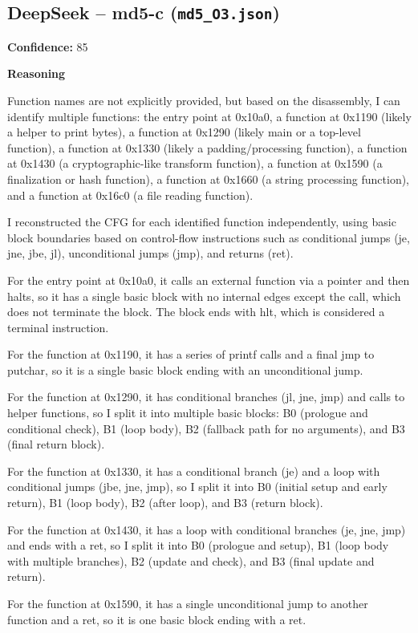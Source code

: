 \subsection{DeepSeek -- md5-c (\texttt{md5\_O3.json})}

\textbf{Confidence:} 85

\textbf{Reasoning}

Function names are not explicitly provided, but based on the disassembly, I can identify multiple functions: the entry point at 0x10a0, a function at 0x1190 (likely a helper to print bytes), a function at 0x1290 (likely main or a top-level function), a function at 0x1330 (likely a padding/processing function), a function at 0x1430 (a cryptographic-like transform function), a function at 0x1590 (a finalization or hash function), a function at 0x1660 (a string processing function), and a function at 0x16c0 (a file reading function).

I reconstructed the CFG for each identified function independently, using basic block boundaries based on control-flow instructions such as conditional jumps (je, jne, jbe, jl), unconditional jumps (jmp), and returns (ret).

For the entry point at 0x10a0, it calls an external function via a pointer and then halts, so it has a single basic block with no internal edges except the call, which does not terminate the block. The block ends with hlt, which is considered a terminal instruction.

For the function at 0x1190, it has a series of printf calls and a final jmp to putchar, so it is a single basic block ending with an unconditional jump.

For the function at 0x1290, it has conditional branches (jl, jne, jmp) and calls to helper functions, so I split it into multiple basic blocks: B0 (prologue and conditional check), B1 (loop body), B2 (fallback path for no arguments), and B3 (final return block).

For the function at 0x1330, it has a conditional branch (je) and a loop with conditional jumps (jbe, jne, jmp), so I split it into B0 (initial setup and early return), B1 (loop body), B2 (after loop), and B3 (return block).

For the function at 0x1430, it has a loop with conditional branches (je, jne, jmp) and ends with a ret, so I split it into B0 (prologue and setup), B1 (loop body with multiple branches), B2 (update and check), and B3 (final update and return).

For the function at 0x1590, it has a single unconditional jump to another function and a ret, so it is one basic block ending with a ret.

